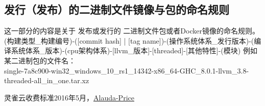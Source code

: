 \documentclass{dingo}
\begin{document}
\begin{appendix}
    \section{发行（发布）的二进制文件镜像与包的命名规则}
    这一部分的内容是关于 发布或发行的 二进制文件包或者Docker镜像的命名规则。
    (构建类型\_构建编号)-([commit hash] | [tag name])-(操作系统体系\_发行版本)-(编译系统体系\_版本)-(cpu架构体系)-[llvm\_版本]-[threaded]-[其他特性]-(模块)
    例如某二进制包的文件名：\\
    single-7a8c900-win32\_windows\_10\_rs1\_14342-x86\_64-GHC\_8.0.1-llvm\_3.8-threaded-all\_in\_one.tar.xz

	  \begin{thebibliography}{}
		 	 灵雀云收费标准2016年5月，\href{http://www.alauda.cn/price/}{Alauda-Price}
		\end{thebibliography}
  \end{appendix}
\end{document}
